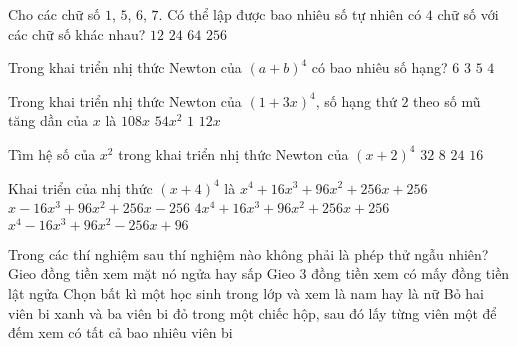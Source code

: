 \begin{ex}%
Cho các chữ số $1$, $5$, $6$, $7$. Có thể lập được bao nhiêu số tự nhiên có $4$ chữ số với các chữ số khác nhau?	
	\choice
	{$12$}
	{$24$}
	{$64$}
	{$256$}
\end{ex}

\begin{ex}%
	Trong khai triển nhị thức Newton của $(a+b)^4$ có bao nhiêu số hạng?
	\choice
	{$6$}
	{$3$}
	{\True $5$}
	{$4$}
\end{ex}

\begin{ex}%
	Trong khai triển nhị thức Newton của $(1+3x)^4$, số hạng thứ $2$ theo số mũ tăng dần của $x$ là
	\choice
	{$108x$}
	{$54x^2$}
	{$1$}
	{\True $12x$}
\end{ex}

\begin{ex}%
	Tìm hệ số của $x^2$ trong khai triển nhị thức Newton của $(x+2)^4$
	\choice
	{$32$}
	{$8$}
	{\True $24$}
	{$16$}
\end{ex}

\begin{ex}%
	Khai triển của nhị thức $(x+4)^4$ là
	\choice
	{\True $x^4+16x^3+96x^2+256x+256$}
	{$x-16x^3+96x^2+256x-256$}
	{$4x^4+16x^3+96x^2+256x+256$}
	{$x^4-16x^3+96x^2-256x+96$}
\end{ex}
\begin{ex}%
	Trong các thí nghiệm sau thí nghiệm nào không phải là phép thử ngẫu nhiên?
	\choice
	{Gieo đồng tiền xem mặt nó ngửa hay sấp}
	{Gieo $3$ đồng tiền xem có mấy đồng tiền lật ngửa}
	{Chọn bất kì một học sinh trong lớp và xem là nam hay là nữ}
	{\True Bỏ hai viên bi xanh và ba viên bi đỏ trong một chiếc hộp, sau đó lấy từng viên một để đếm xem có tất cả bao nhiêu viên bi}
\end{ex}

